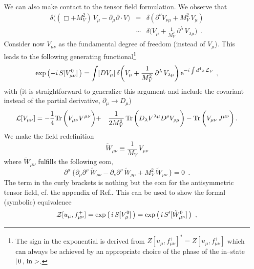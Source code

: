We can also make contact to the tensor field formulation. We observe that
\begin{eqnarray}
\delta\bigl( (\Box+M_V^2) \, V_\mu - \partial_\mu \partial \cdot V \bigr)
&=& \delta ( \partial^\nu V_{\nu \mu} + M_V^2 \, V_\mu ) \nonumber \\
& \sim &
\delta \biggl( V_\mu + \frac{1}{M_V^2} \, \partial^\lambda \, V_{\lambda \mu}
\biggr) \, \, \, .
\label{delta}
\end{eqnarray}
Consider now $V_{\mu \nu}$ as the fundamental degree of freedom (instead of
$V_\mu$). This leads to the following generating functional\footnote{The sign
in the exponential is derived from $Z[u_\mu,f^+_{\mu \nu}]^*  =
Z[u_\mu,f^+_{\mu \nu}]$ which can always be achieved by an appropriate choice
of the phase of the in--state $|0\, , \, {\rm in}>$.}
\begin{equation}
\exp \, \bigl( -i \, S[V^0_{\mu \nu}] \, \bigr) =
\int [DV_\mu] \, \delta\biggl( V_\mu + \frac{1}{M_V^2} \, \partial^\lambda \,
V_{\lambda \mu}\biggr) \, {\rm e}^{-i \int d^4x \, {\cal L}_V} \, \, ,
\end{equation}
with (it is straightforward to generalize this argument and include
the covariant instead of the partial derivative, $\partial_\mu \to D_\mu$)
\begin{eqnarray}
{\cal L}[V_{\mu \nu}] = -\frac{1}{4} {\rm Tr} \,
\biggl( V_{\mu \nu} V^{\mu \nu}
\biggr) &+& \frac{1}{2M_V^2} \, {\rm Tr} \, \biggl(
D_\lambda V^{\lambda \mu}   D^\rho V_{\rho \mu} \biggr)
- {\rm Tr} \, \biggl( V_{\mu \nu} \, J^{\mu \nu}
\biggr) \,  . \nonumber \\
\end{eqnarray}
We make the field redefinition
\begin{equation}
\tilde{W}_{\mu \nu} \equiv \frac{1}{M_V} \, V_{\mu \nu}
\label{redef}
\end{equation}
where $\tilde{W}_{\mu \nu} $ fulfills the following eom,
\begin{equation}
\partial^\mu \, \biggl\{ \partial_\mu \partial^\rho \, \tilde{W}_{\rho \nu}
- \partial_\nu \partial^\rho \, \tilde{W}_{\rho \mu}  +M_V^2 \,
\tilde{W}_{\mu \nu} \, \biggr\} = 0 \, \, \, .
\label{eomwtil}
\end{equation}
The term in the curly brackets is nothing but the eom for the
antisymmetric tensor field, cf. the appendix of Ref.\cite{reso}. This
can be used to show the formal (symbolic) equivalence
\begin{equation}
{\cal Z}[u_\mu, f^+_{\mu \nu}]
= \exp \, \bigl(\, i \, S[V_\mu^0] \, \bigr)
= \exp \, \bigl(\, i \, S'[\tilde{W}_{\mu \nu}^0] \, \bigr) \, \, \, ,
\label{formeq2}
\end{equation}

